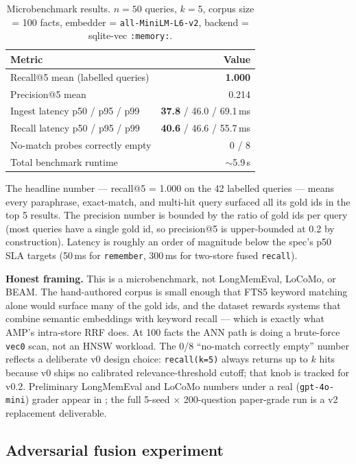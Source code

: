 \documentclass[11pt,letterpaper,twocolumn]{article}
\begin{document}
\begin{table}[t]
\centering
\caption{Microbenchmark results. $n=50$ queries, $k=5$, corpus size = 100 facts, embedder = \texttt{all-MiniLM-L6-v2}, backend = sqlite-vec \texttt{:memory:}.}
\label{tab:microbench}
\small
\begin{tabular}{lr}
\toprule
\textbf{Metric} & \textbf{Value} \\
\midrule
Recall@5 mean (labelled queries) & \textbf{1.000} \\
Precision@5 mean & 0.214 \\
Ingest latency p50 / p95 / p99 & \textbf{37.8} / 46.0 / 69.1\,ms \\
Recall latency p50 / p95 / p99 & \textbf{40.6} / 46.6 / 55.7\,ms \\
No-match probes correctly empty & 0 / 8 \\
Total benchmark runtime & $\sim$5.9\,s \\
\bottomrule
\end{tabular}
\end{table}

The headline number --- recall@5 = 1.000 on the 42 labelled queries --- means every paraphrase, exact-match, and multi-hit query surfaced all its gold ids in the top 5 results. The precision number is bounded by the ratio of gold ids per query (most queries have a single gold id, so precision@5 is upper-bounded at 0.2 by construction). Latency is roughly an order of magnitude below the spec's p50 SLA targets (50\,ms for \texttt{remember}, 300\,ms for two-store fused \texttt{recall}).

\textbf{Honest framing.} This is a microbenchmark, not LongMemEval, LoCoMo, or BEAM. The hand-authored corpus is small enough that FTS5 keyword matching alone would surface many of the gold ids, and the dataset rewards systems that combine semantic embeddings with keyword recall --- which is exactly what AMP's intra-store RRF does. At 100 facts the ANN path is doing a brute-force \texttt{vec0} scan, not an HNSW workload. The 0/8 ``no-match correctly empty'' number reflects a deliberate v0 design choice: \texttt{recall(k=5)} always returns up to $k$ hits because v0 ships no calibrated relevance-threshold cutoff; that knob is tracked for v0.2. Preliminary LongMemEval and LoCoMo numbers under a real (\texttt{gpt-4o-mini}) grader appear in ; the full 5-seed $\times$ 200-question paper-grade run is a v2 replacement deliverable.

\subsection{Adversarial fusion experiment}
\label{sec:eval-adversarial}
\end{document}

